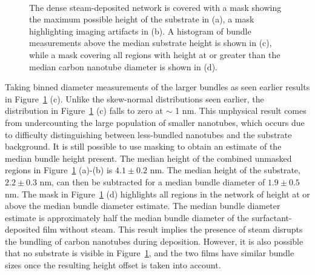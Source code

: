 \documentclass[
  a4paper,
]{scrbook}
\begin{document}
\begin{figure}
\begin{minipage}[t]{0.01\linewidth}
{\centering 

~

}

\end{minipage}%

\caption{\label{fig-dense-network}The dense steam-deposited network is
covered with a mask showing the maximum possible height of the substrate
in (a), a mask highlighting imaging artifacts in (b). A histogram of
bundle measurements above the median substrate height is shown in (c),
while a mask covering all regions with height at or greater than the
median carbon nanotube diameter is shown in (d).}

\end{figure}

Taking binned diameter measurements of the larger bundles as seen
earlier results in Figure~\ref{fig-dense-network} (c). Unlike the
skew-normal distributions seen earlier, the distribution in
Figure~\ref{fig-dense-network} (c) falls to zero at \(\sim\) 1 nm. This
unphysical result comes from undercounting the large population of
smaller nanotubes, which occurs due to difficulty distinguishing between
less-bundled nanotubes and the substrate background. It is still
possible to use masking to obtain an estimate of the median bundle
height present. The median height of the combined unmasked regions in
Figure~\ref{fig-dense-network} (a)-(b) is \(4.1 \pm 0.2\) nm. The median
height of the substrate, \(2.2 \pm 0.3\) nm, can then be subtracted for
a median bundle diameter of \(1.9 \pm 0.5\) nm. The mask in
Figure~\ref{fig-dense-network} (d) highlights all regions in the network
of height at or above the median bundle diameter estimate. The median
bundle diameter estimate is approximately half the median bundle
diameter of the surfactant-deposited film without steam. This result
implies the presence of steam disrupts the bundling of carbon nanotubes
during deposition. However, it is also possible that no substrate is
visible in Figure~\ref{fig-dense-network}, and the two films have
similar bundle sizes once the resulting height offset is taken into
account.
\end{document}
